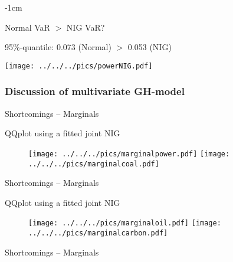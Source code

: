 {-1cm}
\begin{center}
Normal VaR $>$ NIG VaR?
\end{center}
95\%-quantile: \hspace{1cm} 0.073 (Normal) \hspace{1cm}$>$ \hspace{1cm} 0.053 (NIG) \\
\begin{center}
\texttt{[image: ../../../pics/powerNIG.pdf]}
\end{center}

 \subsubsection{Discussion of multivariate GH-model}

{Shortcomings -- Marginals} %
\begin{center}
QQplot using a fitted joint NIG
\begin{figure}
\begin{center}
\texttt{[image: ../../../pics/marginalpower.pdf]}
\texttt{[image: ../../../pics/marginalcoal.pdf]}
\end{center}
\end{figure}
\end{center}

{Shortcomings -- Marginals} %
\begin{center}
QQplot using a fitted joint NIG
\begin{figure}
\begin{center}
\texttt{[image: ../../../pics/marginaloil.pdf]}
\texttt{[image: ../../../pics/marginalcarbon.pdf]}
\end{center}
\end{figure}
\end{center}

{Shortcomings -- Marginals} %




